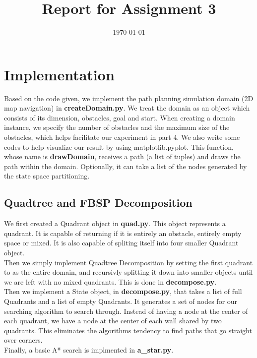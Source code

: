 \documentclass[12pt,a4paper]{article}
\title{
	\Huge{\bf{Report for Assignment 3}}
}
\date{
\today
}
\begin{document}
\maketitle
\section{Implementation}

Based on the code given, we implement the path planning simulation domain (2D map navigation) in \textbf{createDomain.py}. We treat the domain as an object which consists of its dimension, obstacles, goal and start. When creating a domain instance, we specify the number of obstacles and the maximum size of the obstacles, which helps facilitate our experiment in part 4. We also write some codes to help visualize our result by using matplotlib.pyplot. This function, whose name is \textbf{drawDomain}, receives a path (a list of tuples) and draws the path within the domain. Optionally, it can take a list of the nodes generated by the state space 
partitioning. 

\subsection{Quadtree and FBSP Decomposition}

We first created a Quadrant object in \textbf{quad.py}.
This object represents a quadrant. It is capable of
returning if it is entirely an obstacle, entirely empty
space or mixed. It is also capable of spliting itself
into four smaller Quadrant object.\\

Then we simply implement Quadtree Decomposition by setting the first quadrant to as the entire domain, and 
recursivly splitting it down into smaller objects until 
we are left with no mixed quadrants. This is done
in \textbf{decompose.py}.\\

Then we implement a State object, in \textbf{decompose.py}, 
that takes a list of full Quadrants and a list of empty
Quadrants. It generates a set of nodes for our searching
algorithm to search through. Instead of having a node at
the center of each quadrant, we have a node at the center 
of each wall shared by two quadrants. This eliminates the
algorithms tendency to find paths that go straight over
corners.\\

Finally, a basic A* search is implmented in \textbf{a\_star.py}.\\
\end{document}
